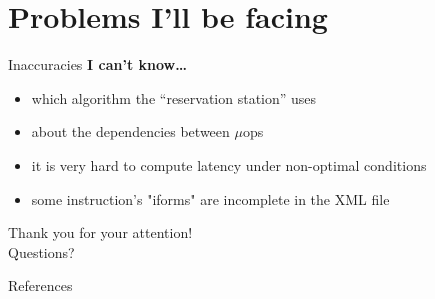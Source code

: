\documentclass[10pt, tikz,border=2mm, xcolor=dvipsnames]{beamer}
\begin{document}
\section{Problems I'll be facing}

\begin{frame}{Inaccuracies}
\textbf{I can't know\dots}
\begin{itemize}[<+- | alert@+>]
    \item which algorithm the ``reservation station'' uses
    \item about the dependencies between $\mu$ops
\end{itemize}
\begin{itemize}[<+- | alert@+>]
    \item it is very hard to compute latency under non-optimal conditions
    \item some instruction's "iforms" are incomplete in the XML file
\end{itemize}
\end{frame}


{
\begin{frame}[standout]
  Thank you for your attention!\\
  Questions?
\end{frame}
}


\begin{frame}{References}

  
  

\end{frame}
\end{document}
